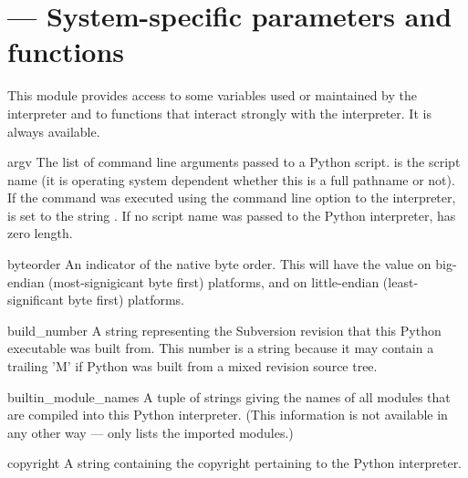 \section{ ---
         System-specific parameters and functions}


This module provides access to some variables used or maintained by the
interpreter and to functions that interact strongly with the interpreter.
It is always available.


\begin{datadesc}{argv}
  The list of command line arguments passed to a Python script.
   is the script name (it is operating system dependent
  whether this is a full pathname or not).  If the command was
  executed using the  command line option to the
  interpreter,  is set to the string .  If no
  script name was passed to the Python interpreter,  has
  zero length.
\end{datadesc}

\begin{datadesc}{byteorder}
  An indicator of the native byte order.  This will have the value
   on big-endian (most-signigicant byte first) platforms,
  and  on little-endian (least-significant byte first)
  platforms.
\end{datadesc}

\begin{datadesc}{build_number}
  A string representing the Subversion revision that this Python executable
  was built from.  This number is a string because it may contain a trailing
  'M' if Python was built from a mixed revision source tree.
\end{datadesc}  

\begin{datadesc}{builtin_module_names}
  A tuple of strings giving the names of all modules that are compiled
  into this Python interpreter.  (This information is not available in
  any other way ---  only lists the imported
  modules.)
\end{datadesc}

\begin{datadesc}{copyright}
  A string containing the copyright pertaining to the Python
  interpreter.
\end{datadesc}

